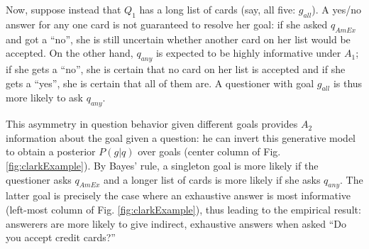 \documentclass[11pt, floatsintext]{apa6}
\begin{document}
Now, suppose instead that $Q_1$ has a long list of cards (say, all five: $g_{all}$). A yes/no answer for any one card is not guaranteed to resolve her goal: if she asked $q_{AmEx}$ and got a ``no'', she is still uncertain whether another card on her list would be accepted. On the other hand, $q_{any}$ is expected to be highly informative under $A_1$; if she gets a ``no'', she is certain that no card on her list is accepted and if she gets a ``yes'', she is certain that all of them are. A questioner with goal $g_{all}$ is thus more likely to ask $q_{any}$.

This asymmetry in question behavior given different goals provides $A_2$ information about the goal given a question: he can invert this generative model to obtain a posterior $P(g | q)$ over goals (center column of Fig. \ref{fig:clarkExample}). By Bayes' rule, a singleton goal is more likely if the questioner asks $q_{AmEx}$ and a longer list of cards is more likely if she asks $q_{any}$. The latter goal is precisely the case where an exhaustive answer is most informative (left-most column of Fig. \ref{fig:clarkExample}), thus leading to the empirical result: answerers are more likely to give indirect, exhaustive answers when asked ``Do you accept credit cards?'' 


\end{document}
